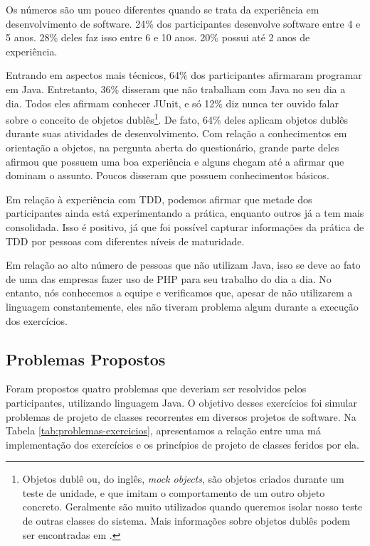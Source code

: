 \documentclass[conference]{IEEEtran}
\begin{document}
Os números são um pouco diferentes quando se trata da experiência em desenvolvimento
de software. 24\% dos participantes desenvolve software entre 4 e 5 anos.
28\% deles faz isso entre 6 e 10 anos. 20\% possui até 2 anos de experiência.

Entrando em aspectos mais técnicos, 64\% dos participantes afirmaram programar em Java. Entretanto,
36\% disseram que não trabalham com Java no seu dia a dia. Todos eles afirmam conhecer JUnit,
e só 12\% diz nunca ter ouvido falar sobre o conceito de objetos dublês\footnote{Objetos dublê ou, do inglês, 
\textit{mock objects}, são objetos criados durante um teste de unidade, e que imitam o comportamento de um
outro objeto concreto. Geralmente são muito utilizados quando queremos isolar nosso teste de outras classes
do sistema. Mais informações sobre objetos dublês podem ser encontradas em \cite{mocks}.}. De fato, 64\% deles
aplicam objetos dublês durante suas atividades de desenvolvimento. Com relação a conhecimentos
em orientação a objetos, na pergunta aberta do questionário, grande parte deles 
afirmou que possuem uma boa experiência e alguns
chegam até a afirmar que dominam o assunto. Poucos disseram que possuem conhecimentos
básicos.

Em relação à experiência com TDD,
podemos afirmar que metade dos participantes ainda está experimentando a prática, enquanto
outros já a tem mais consolidada. Isso é positivo, já que foi possível capturar informações
da prática de TDD por pessoas com diferentes níveis de maturidade.

Em relação ao alto número de pessoas que não utilizam Java, isso se deve ao fato de uma das
empresas fazer uso de PHP para seu trabalho do dia a dia. No entanto, nós conhecemos a equipe
e verificamos que, apesar de não utilizarem a linguagem constantemente, eles não tiveram
problema algum durante a execução dos exercícios.

\subsection{Problemas Propostos}
\label{sec:exercicios}

Foram propostos quatro problemas que deveriam ser resolvidos pelos participantes, utilizando
linguagem Java. O objetivo desses exercícios foi simular problemas de projeto de classes 
recorrentes em diversos projetos de software. 
Na Tabela \ref{tab:problemas-exercicios}, apresentamos a relação entre uma má
implementação dos exercícios e os princípios de projeto de classes feridos por
ela.
\end{document}
